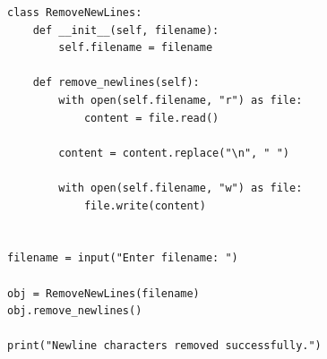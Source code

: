 \begin{verbatim}
class RemoveNewLines:
    def __init__(self, filename):
        self.filename = filename

    def remove_newlines(self):
        with open(self.filename, "r") as file:
            content = file.read()

        content = content.replace("\n", " ")

        with open(self.filename, "w") as file:
            file.write(content)


filename = input("Enter filename: ")

obj = RemoveNewLines(filename)
obj.remove_newlines()

print("Newline characters removed successfully.")
\end{verbatim}